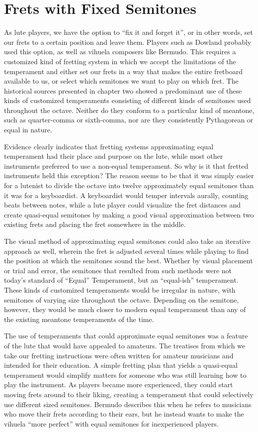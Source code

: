 \section{Frets with Fixed Semitones}

As lute players, we have the option to ``fix it and forget it'', or in other words, set our frets to a certain position
and leave them. Players such as Dowland probably used this option, as well as vihuela composers like Bermudo. This
requires a customized kind of fretting system in which we accept the limitations of the temperament and either set our
frets in a way that makes the entire fretboard available to us, or select which semitones we want to play on which fret.
The historical sources presented in chapter two showed a predominant use of these kinds of customized temperaments
consisting of different kinds of semitones used throughout the octave. Neither do they conform to a particular kind of
meantone, such as quarter-comma or sixth-comma, nor are they consistently Pythagorean or equal in nature.

Evidence clearly indicates that fretting systems approximating equal temperament had their place and purpose on the
lute, while most other instruments preferred to use a non-equal temperament. So why is it that fretted instruments held
this exception? The reason seems to be that it was simply easier for a lutenist to divide the octave into twelve
approximately equal semitones than it was for a keyboardist. A keyboardist would temper intervals aurally, counting
beats between notes, while a lute player could visualize the fret distances and create quasi-equal semitones by making a
good visual approximation between two existing frets and placing the fret somewhere in the middle.

The visual method of approximating equal semitones could also take an iterative approach as well, wherein the fret is
adjusted several times while playing to find the position at which the semitones sound the best. Whether by visual
placement or trial and error, the semitones that resulted from such methods were not today's standard of ``Equal''
Temperament, but an ``equal-ish'' temperament. These kinds of customized temperaments would be irregular in nature, with
semitones of varying size throughout the octave. Depending on the semitone, however, they would be much closer to
modern equal temperament than any of the existing meantone temperaments of the time.

The use of temperaments that could approximate equal semitones was a feature of the lute that would have appealed to
amateurs. The treatises from which we take our fretting instructions were often written for amateur musicians and
intended for their education. A simple fretting plan that yields a quasi-equal temperament would simplify matters for
someone who was still learning how to play the instrument. As players became more experienced, they could start moving
frets around to their liking, creating a temperament that could selectively use different sized semitones. Bermudo
describes this when he refers to musicians who move their frets according to their ears, but he instead wants to make
the vihuela ``more perfect'' with equal semitones for inexperienced players.\autocite[78]{DE:1}

